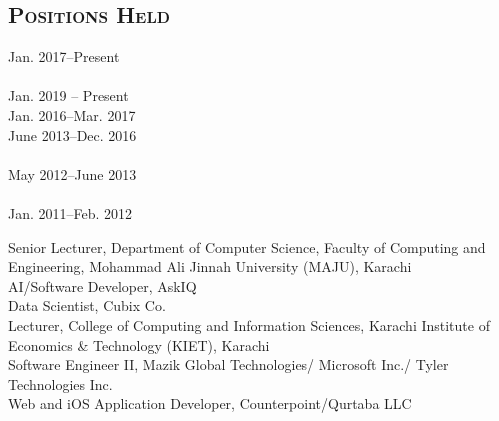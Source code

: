 \documentclass[a4paper, 10pt]{article}
\begin{document}
\subsection*{\normalfont\textsc{\bf Positions Held}}
\hfill\begin{minipage}{0.23\textwidth}
Jan. 2017--Present\textcolor{lightgray}{\dotfill}\\\\
Jan. 2019 -- Present \textcolor{lightgray}{\dotfill}\\
Jan. 2016--Mar. 2017\textcolor{lightgray}{\dotfill}\\
June 2013--Dec. 2016\textcolor{lightgray}{\dotfill}\\\\
May 2012--June 2013\textcolor{lightgray}{\dotfill}\\\\
Jan. 2011--Feb. 2012\textcolor{lightgray}{\dotfill}
\end{minipage}
\begin{minipage}{0.75\textwidth}
Senior Lecturer, Department of Computer Science, Faculty of Computing and Engineering, Mohammad Ali Jinnah University (MAJU), Karachi\\
AI/Software Developer, AskIQ\\
Data Scientist, Cubix Co.\\
Lecturer, College of Computing and Information Sciences, Karachi Institute of Economics \& Technology (KIET), Karachi\\
Software Engineer II, Mazik Global Technologies/ Microsoft Inc./ Tyler Technologies Inc.\\
Web and iOS Application Developer, Counterpoint/Qurtaba LLC
\end{minipage}

\end{document}

